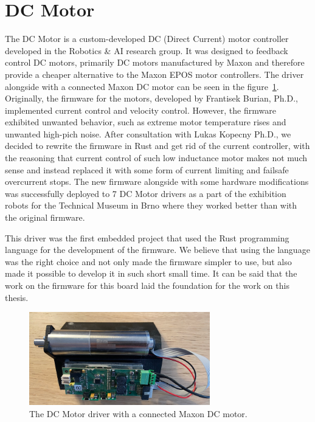 \section{DC Motor}
\label{sec:dcmotor}
The DC Motor is a custom-developed DC (Direct Current) motor controller developed in the Robotics \& AI research group.
It was designed to feedback control DC motors, primarily DC motors manufactured by Maxon and therefore provide a cheaper alternative to the Maxon EPOS motor controllers.
The driver alongside with a connected Maxon DC motor can be seen in the figure~\ref{fig:dcmotor}.
Originally, the firmware for the motors, developed by Frantisek Burian, Ph.D., implemented current control and velocity control.
However, the firmware exhibited unwanted behavior, such as extreme motor temperature rises and unwanted high-pich noise.
After consultation with Lukas Kopecny Ph.D., we decided to rewrite the firmware in Rust and get rid of the current controller, with the reasoning that current control of such low inductance motor makes not much sense and instead replaced it with some form of current limiting and failsafe overcurrent stops.
The new firmware alongside with some hardware modifications was successfully deployed to 7 DC Motor drivers as a part of the exhibition robots for the Technical Museum in Brno where they worked better than with the original firmware.

This driver was the first embedded project that used the Rust programming language for the development of the firmware.
We believe that using the language was the right choice and not only made the firmware simpler to use, but also made it possible to develop it in such short small time.
It can be said that the work on the firmware for this board laid the foundation for the work on this thesis.

\begin{figure}[H]
    \centering
    \includegraphics[width=0.7\textwidth]{obrazky/dcmotor}
    \caption{The DC Motor driver with a connected Maxon DC motor.}
    \label{fig:dcmotor}
\end{figure}

